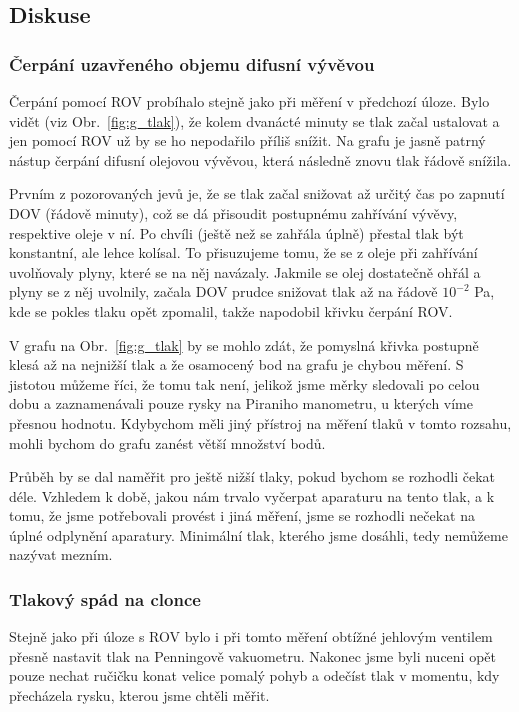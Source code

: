 \documentclass[english]{article}
\begin{document}
	\subsection{Diskuse}
		
		\subsubsection{Čerpání uzavřeného objemu difusní vývěvou}
			Čerpání pomocí ROV probíhalo stejně jako při měření v předchozí úloze. Bylo vidět (viz Obr.~\ref{fig:g_tlak}), že kolem dvanácté minuty se tlak začal ustalovat a jen pomocí ROV už by se ho nepodařilo příliš snížit. Na grafu je jasně patrný nástup čerpání difusní olejovou vývěvou, která následně znovu tlak řádově snížila.
			
			Prvním z pozorovaných jevů je, že se tlak začal snižovat až určitý čas po zapnutí DOV (řádově minuty), což se dá přisoudit postupnému zahřívání vývěvy, respektive oleje v ní. Po chvíli (ještě než se zahřála úplně) přestal tlak být konstantní, ale lehce kolísal. To přisuzujeme tomu, že se z oleje při zahřívání uvolňovaly plyny, které se na něj navázaly. Jakmile se olej dostatečně ohřál a plyny se z něj uvolnily, začala DOV prudce snižovat tlak až na řádově $10^{-2}$ Pa, kde se pokles tlaku opět zpomalil, takže napodobil křivku čerpání ROV.
			
			V grafu na Obr.~\ref{fig:g_tlak} by se mohlo zdát, že pomyslná křivka postupně klesá až na nejnižší tlak a že osamocený bod na grafu je chybou měření. S jistotou můžeme říci, že tomu tak není, jelikož jsme měrky sledovali po celou dobu a zaznamenávali pouze rysky na Piraniho manometru, u kterých víme přesnou hodnotu. Kdybychom měli jiný přístroj na měření tlaků v tomto rozsahu, mohli bychom do grafu zanést větší množství bodů.
			
			Průběh by se dal naměřit pro ještě nižší tlaky, pokud bychom se rozhodli čekat déle. Vzhledem k době, jakou nám trvalo vyčerpat aparaturu na tento tlak, a k tomu, že jsme potřebovali provést i jiná měření, jsme se rozhodli nečekat na úplné odplynění aparatury. Minimální tlak, kterého jsme dosáhli, tedy nemůžeme nazývat mezním.
		
		\subsubsection{Tlakový spád na clonce}
			Stejně jako při úloze s ROV bylo i při tomto měření obtížné jehlovým ventilem přesně nastavit tlak na Penningově vakuometru. Nakonec jsme byli nuceni opět pouze nechat ručičku konat velice pomalý pohyb a odečíst tlak v momentu, kdy přecházela rysku, kterou jsme chtěli měřit. 
			
\end{document}
